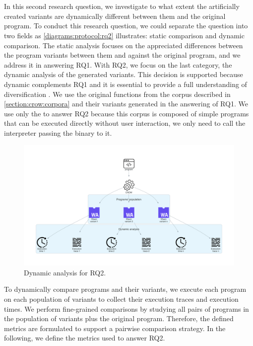
\section{\rqtwo}
\label{rq2:method}


In this second research question, we investigate to what extent the artificially created variants are dynamically different between them and the original program. To conduct this research question, we could separate the question into two fields as \autoref{diagrams:protocol:rq2} illustrates: static comparison and dynamic comparison. 
The static analysis focuses on the appreciated differences between the program variants between them and against the original program, and we address it in answering RQ1. 
With RQ2, we focus on the last category, the dynamic analysis of the generated variants. This decision is supported because dynamic complements RQ1 and it is essential to provide a full understanding of diversification \citationneeded.
We use the original functions from the \corpusrosetta corpus described in \autoref{section:crow:corpora} and their variants generated in the answering of RQ1. 
We use only the \corpusrosetta to answer RQ2 because this corpus is composed of simple programs that can be executed directly without user interaction, \ie we only need to call the interpreter passing the \wasm binary to it. 


\begin{figure}[h]
    \centering
    \includegraphics[width=\linewidth]{diagrams/Rq2.pdf}
    \caption{Dynamic analysis for RQ2.}
    \label{diagrams:protocol:rq2}
\end{figure}

To dynamically compare programs and their variants, we execute each program on each population of variants to collect their execution traces and execution times. We perform fine-grained comparisons by studying all pairs of programs in the population of variants plus the original program. Therefore, the defined metrics are formulated to support a pairwise comparison strategy.
In the following, we define the metrics used to answer RQ2.


